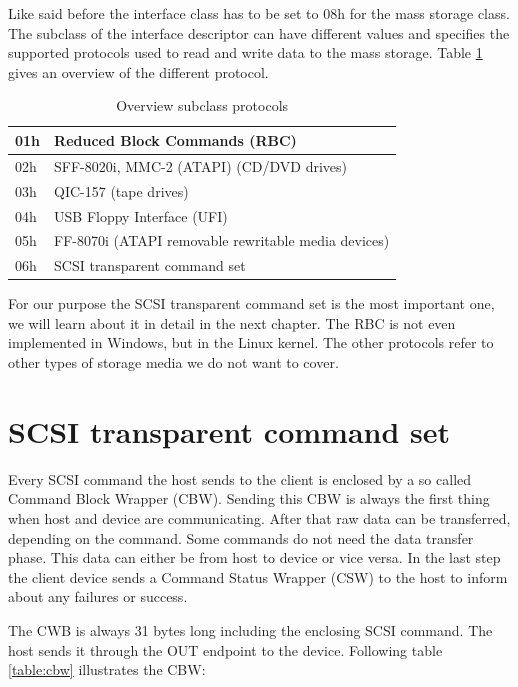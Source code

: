 Like said before the interface class has to be set to 08h for the mass storage class. The subclass of the interface descriptor can have different values and specifies the supported protocols used to read and write data to the mass storage. Table \ref{table:subclass} gives an overview of the different protocol.

\begin{table}[ht]
\caption{Overview subclass protocols \cite{usb_ms_jan}}
\centering
\begin{tabular}{|l|l|}
\hline\hline
01h & Reduced Block Commands (RBC) \\ \hline
02h & SFF-8020i, MMC-2 (ATAPI) (CD/DVD drives) \\ \hline
03h & QIC-157 (tape drives) \\ \hline
04h & USB Floppy Interface (UFI) \\ \hline
05h & FF-8070i (ATAPI removable rewritable media devices) \\ \hline
06h & SCSI transparent command set \\ \hline
\end{tabular}
\label{table:subclass}
\end{table}

For our purpose the SCSI transparent command set is the most important one, we will learn about it in detail in the next chapter. The RBC is not even implemented in Windows, but in the Linux kernel\cite{usb_ms_jan}. The other protocols refer to other types of storage media we do not want to cover.

\section{SCSI transparent command set}

Every SCSI command the host sends to the client is enclosed by a so called Command Block Wrapper (CBW). Sending this CBW is always the first thing when host and device are communicating. After that raw data can be transferred, depending on the command. Some commands do not need the data transfer phase. This data can either be from host to device or vice versa. In the last step the client device sends a Command Status Wrapper (CSW) to the host to inform about any failures or success.

The CWB is always 31 bytes long including the enclosing SCSI command. The host sends it through the OUT endpoint to the device. Following table \ref{table:cbw} illustrates the CBW:

